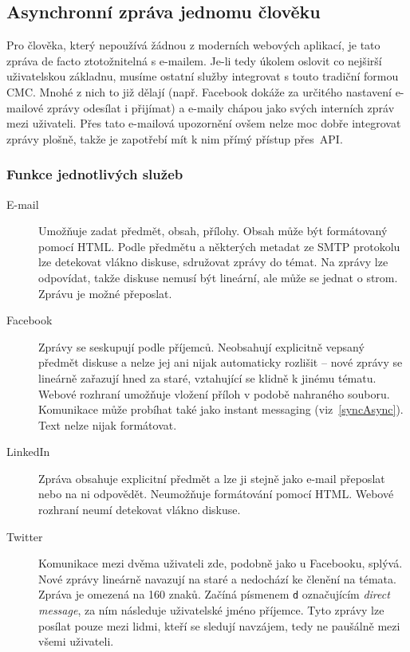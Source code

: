\documentclass[12pt,oneside,final]{fithesis2}
\begin{document}
\subsection{Asynchronní zpráva jednomu člověku}
Pro člověka, který nepoužívá žádnou z moderních webových aplikací, je tato zpráva de facto ztotožnitelná s e-mailem. Je-li tedy úkolem oslovit co nejširší uživatelskou základnu, musíme ostatní služby integrovat s touto tradiční formou CMC. Mnohé z nich to již dělají (např. Facebook dokáže za určitého nastavení e-mailové zprávy odesílat i přijímat) a e-maily chápou jako  svých interních zpráv mezi uživateli. Přes tato e-mailová upozornění ovšem nelze moc dobře integrovat zprávy plošně, takže je zapotřebí mít k nim přímý přístup přes~API.

\subsubsection*{Funkce jednotlivých služeb}
\begin{description}
    \item[E-mail]
        Umožňuje zadat předmět, obsah, přílohy. Obsah může být formátovaný pomocí HTML. Podle předmětu a některých metadat ze SMTP protokolu lze detekovat vlákno diskuse, sdružovat zprávy do témat. Na zprávy lze odpovídat, takže diskuse nemusí být lineární, ale může se jednat o strom. Zprávu je možné přeposlat.

    \item[Facebook]
        Zprávy se seskupují podle příjemců. Neobsahují explicitně vepsaný předmět diskuse a nelze jej ani nijak automaticky rozlišit -- nové zprávy se lineárně zařazují hned za staré, vztahující se klidně k jinému tématu. Webové rozhraní umožňuje vložení příloh v podobě nahraného souboru. Komunikace může probíhat také jako instant messaging (viz~\ref{syncAsync}). Text nelze nijak formátovat.

    \item[LinkedIn]
        Zpráva obsahuje explicitní předmět a lze ji stejně jako e-mail přeposlat nebo na ni odpovědět. Neumožňuje formátování pomocí HTML. Webové rozhraní neumí detekovat vlákno diskuse.

    \item[Twitter]
        Komunikace mezi dvěma uživateli zde, podobně jako u Facebooku, splývá. Nové zprávy lineárně navazují na staré a nedochází ke členění na témata. Zpráva je omezená na 160 znaků. Začíná písmenem {\tt d} označujícím \emph{direct message}, za ním následuje uživatelské jméno příjemce. Tyto zprávy lze posílat pouze mezi lidmi, kteří se sledují navzájem, tedy ne paušálně mezi všemi uživateli.
\end{description}
\end{document}
